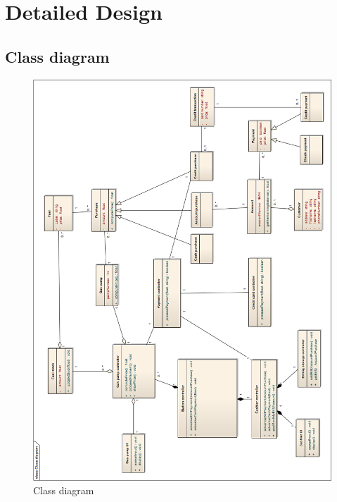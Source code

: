 \section{Detailed Design}
\subsection{Class diagram}

\begin{figure}[H]
 \centering
 \includegraphics[width=\textwidth]{../ClassDiagram.png} 
 \caption{Class diagram}
 \label{fig:dep}
\end{figure}
